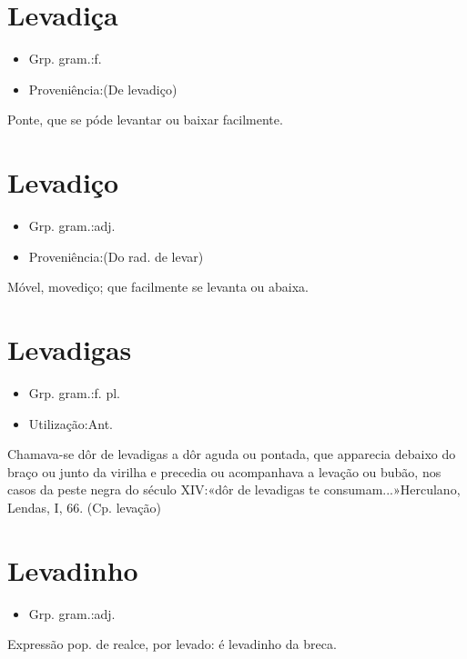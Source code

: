\section{Levadiça}
\begin{itemize}
\item {Grp. gram.:f.}
\end{itemize}
\begin{itemize}
\item {Proveniência:(De \textunderscore levadiço\textunderscore )}
\end{itemize}
Ponte, que se póde levantar ou baixar facilmente.
\section{Levadiço}
\begin{itemize}
\item {Grp. gram.:adj.}
\end{itemize}
\begin{itemize}
\item {Proveniência:(Do rad. de \textunderscore levar\textunderscore )}
\end{itemize}
Móvel, movediço; que facilmente se levanta ou abaixa.
\section{Levadigas}
\begin{itemize}
\item {Grp. gram.:f. pl.}
\end{itemize}
\begin{itemize}
\item {Utilização:Ant.}
\end{itemize}
Chamava-se dôr de levadigas a dôr aguda ou pontada, que apparecia debaixo do braço ou junto da virilha e precedia ou acompanhava a levação ou bubão, nos casos da peste negra do século XIV:«\textunderscore dôr de levadigas te consumam...\textunderscore »Herculano, \textunderscore Lendas\textunderscore , I, 66.
(Cp. \textunderscore levação\textunderscore )
\section{Levadinho}
\begin{itemize}
\item {Grp. gram.:adj.}
\end{itemize}
Expressão pop. de realce, por \textunderscore levado\textunderscore : \textunderscore é levadinho da breca\textunderscore .
